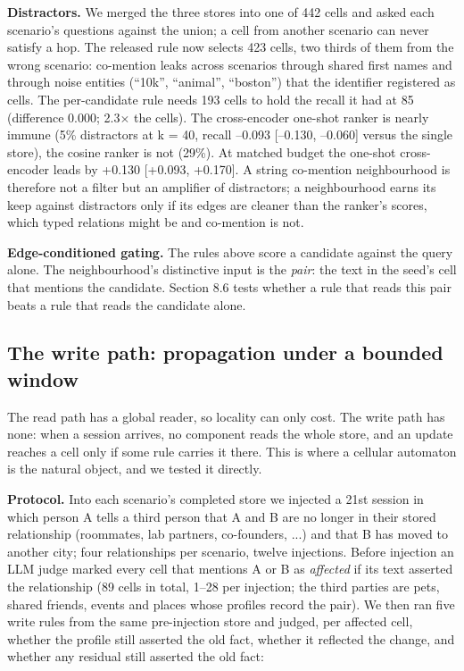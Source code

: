 \documentclass[11pt]{article}
\begin{document}
\textbf{Distractors.} We merged the three stores into one of 442 cells and asked each scenario's questions against the union; a cell from another scenario can never satisfy a hop. The released rule now selects 423 cells, two thirds of them from the wrong scenario: co-mention leaks across scenarios through shared first names and through noise entities (``10k'', ``animal'', ``boston'') that the identifier registered as cells. The per-candidate rule needs 193 cells to hold the recall it had at 85 (difference 0.000; 2.3$\times$ the cells). The cross-encoder one-shot ranker is nearly immune (5\% distractors at k = 40, recall --0.093 [--0.130, --0.060] versus the single store), the cosine ranker is not (29\%). At matched budget the one-shot cross-encoder leads by +0.130 [+0.093, +0.170]. A string co-mention neighbourhood is therefore not a filter but an amplifier of distractors; a neighbourhood earns its keep against distractors only if its edges are cleaner than the ranker's scores, which typed relations might be and co-mention is not.

\textbf{Edge-conditioned gating.} The rules above score a candidate against the query alone. The neighbourhood's distinctive input is the \emph{pair}: the text in the seed's cell that mentions the candidate. Section 8.6 tests whether a rule that reads this pair beats a rule that reads the candidate alone.

\subsection{The write path: propagation under a bounded window}

The read path has a global reader, so locality can only cost. The write path has none: when a session arrives, no component reads the whole store, and an update reaches a cell only if some rule carries it there. This is where a cellular automaton is the natural object, and we tested it directly.

\textbf{Protocol.} Into each scenario's completed store we injected a 21st session in which person A tells a third person that A and B are no longer in their stored relationship (roommates, lab partners, co-founders, ...) and that B has moved to another city; four relationships per scenario, twelve injections. Before injection an LLM judge marked every cell that mentions A or B as \emph{affected} if its text asserted the relationship (89 cells in total, 1--28 per injection; the third parties are pets, shared friends, events and places whose profiles record the pair). We then ran five write rules from the same pre-injection store and judged, per affected cell, whether the profile still asserted the old fact, whether it reflected the change, and whether any residual still asserted the old fact:
\end{document}
